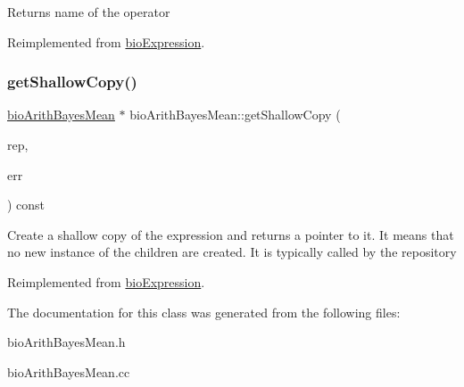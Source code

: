 \begin{DoxyReturn}{Returns}
name of the operator 
\end{DoxyReturn}


Reimplemented from \hyperlink{classbio_expression_a2353a4afb3a2b0af7c63aba086a72bde}{bio\+Expression}.

\mbox{\label{classbio_arith_bayes_mean_a1cee3c48858490ec488b2754c32c56f2}} 
\subsubsection{\texorpdfstring{get\+Shallow\+Copy()}{getShallowCopy()}}
{\footnotesize\ttfamily \hyperlink{classbio_arith_bayes_mean}{bio\+Arith\+Bayes\+Mean} $\ast$ bio\+Arith\+Bayes\+Mean\+::get\+Shallow\+Copy (\begin{DoxyParamCaption}\item[{\hyperlink{classbio_expression_repository}{bio\+Expression\+Repository} $\ast$}]{rep,  }\item[{pat\+Error $\ast$\&}]{err }\end{DoxyParamCaption}) const\hspace{0.3cm}{\ttfamily [virtual]}}

Create a shallow copy of the expression and returns a pointer to it. It means that no new instance of the children are created. It is typically called by the repository 

Reimplemented from \hyperlink{classbio_expression_a442534762693b92baaf33928979a1bf8}{bio\+Expression}.



The documentation for this class was generated from the following files\+:\begin{DoxyCompactItemize}
\item 
bio\+Arith\+Bayes\+Mean.\+h\item 
bio\+Arith\+Bayes\+Mean.\+cc\end{DoxyCompactItemize}
